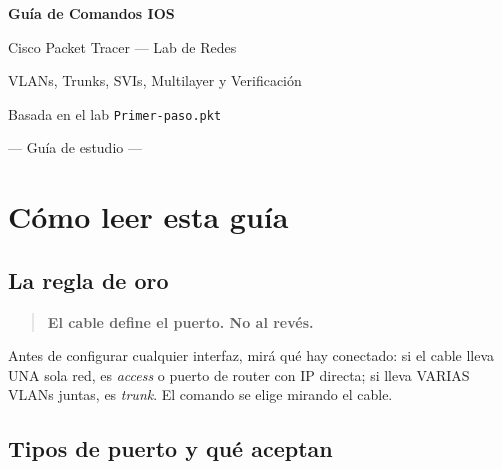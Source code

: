 \documentclass[11pt,a4paper]{report}
\begin{document}
\sloppy

\begin{titlepage}
  \centering
  \vspace*{2cm}

  {\Huge \bfseries Guía de Comandos IOS \par}
  \vspace{0.8cm}
  {\LARGE Cisco Packet Tracer --- Lab de Redes \par}
  \vspace{1.5cm}

  {\large VLANs, Trunks, SVIs, Multilayer y Verificación \par}
  \vspace{2cm}

  {\large Basada en el lab \texttt{Primer-paso.pkt} \par}
  \vspace{1cm}

  {\large --- Guía de estudio --- \par}

  \vfill
\end{titlepage}

\tableofcontents
\newpage

\chapter{Cómo leer esta guía}

\section{La regla de oro}

\begin{quote}
\textbf{El cable define el puerto. No al revés.}
\end{quote}

Antes de configurar cualquier interfaz, mirá qué hay conectado: si el cable lleva UNA sola red, es \emph{access} o puerto de router con IP directa; si lleva VARIAS VLANs juntas, es \emph{trunk}. El comando se elige mirando el cable.

\section{Tipos de puerto y qué aceptan}
\end{document}
